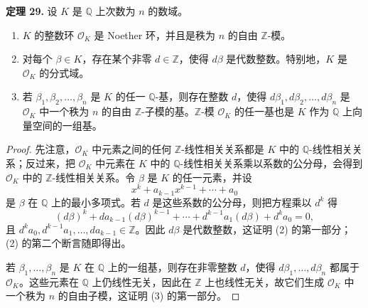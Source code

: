 \noindent\textbf{定理 29.} 设 $K$ 是 $\mathbb Q$ 上次数为 $n$ 的数域。
\begin{enumerate}[label=(\arabic*)]
	\item $K$ 的整数环 $\mathcal O_K$ 是 Noether 环，并且是秩为 $n$ 的自由 $\mathbb Z$-模。
	\item 对每个 $\beta\in K$，存在某个非零 $d\in\mathbb Z$，使得 $d\beta$ 是代数整数。特别地，$K$ 是 $\mathcal O_K$ 的分式域。
	\item 若 $\beta_1,\beta_2,
	\ldots,
	\beta_n$ 是 $K$ 的任一 $\mathbb Q$-基，则存在整数 $d$，使得 $d\beta_1,d\beta_2,
	\ldots,d\beta_n$ 是 $\mathcal O_K$ 中一个秩为 $n$ 的自由 $\mathbb Z$-子模的基。$\mathbb Z$-模 $\mathcal O_K$ 的任一基也是 $K$ 作为 $\mathbb Q$ 上向量空间的一组基。
\end{enumerate}

\begin{proof}
	先注意，$\mathcal O_K$ 中元素之间的任何 $\mathbb Z$-线性相关关系都是 $K$ 中的 $\mathbb Q$-线性相关关系；反过来，把 $\mathcal O_K$ 中元素在 $K$ 中的 $\mathbb Q$-线性相关关系乘以系数的公分母，会得到 $\mathcal O_K$ 中的 $\mathbb Z$-线性相关关系。令 $\beta$ 是 $K$ 的任一元素，并设
	\[
	x^k+a_{k-1}x^{k-1}+\cdots+a_0
	\]
	是 $\beta$ 在 $\mathbb Q$ 上的最小多项式。若 $d$ 是这些系数的公分母，则把方程乘以 $d^k$ 得
	\[
	(d\beta)^k+da_{k-1}(d\beta)^{k-1}+\cdots+d^{k-1}a_1(d\beta)+d^ka_0=0,
	\]
	且 $d^ka_0,d^{k-1}a_1,
	\ldots,da_{k-1}\in\mathbb Z$。因此 $d\beta$ 是代数整数，这证明 (2) 的第一部分；(2) 的第二个断言随即得出。
	
	若 $\beta_1,
	\ldots,
	\beta_n$ 是 $K$ 在 $\mathbb Q$ 上的一组基，则存在非零整数 $d$，使得 $d\beta_1,
	\ldots,d\beta_n$ 都属于 $\mathcal O_K$。这些元素在 $\mathbb Q$ 上仍线性无关，因此在 $\mathbb Z$ 上也线性无关，故它们生成 $\mathcal O_K$ 中一个秩为 $n$ 的自由子模，这证明 (3) 的第一部分。
	

\end{proof}
